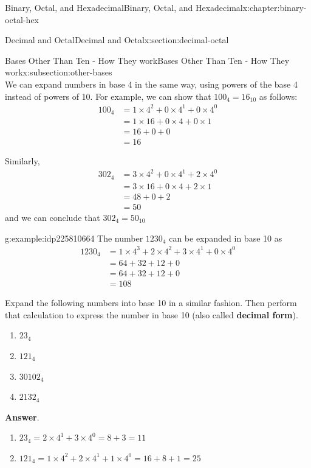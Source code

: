 \documentclass[twoside,10pt,]{book}
\newcommand{\blocktitlefont}{\relax}
\newcommand{\terminology}[1]{\textbf{#1}}
\numberwithin{equation}{section}
\newcommand{\amp}{&}
\begin{document}
\begin{chapterptx}{Binary, Octal, and Hexadecimal}{}{Binary, Octal, and Hexadecimal}{}{}{x:chapter:binary-octal-hex}
\begin{sectionptx}{Decimal and Octal}{}{Decimal and Octal}{}{}{x:section:decimal-octal}
\begin{subsectionptx}{Bases Other Than Ten - How They work}{}{Bases Other Than Ten - How They work}{}{}{x:subsection:other-bases}
\begin{equation*}
\end{equation*}
We can expand numbers in base 4 in the same way, using powers of the base 4 instead of powers of 10.  For example, we can show that \(100_4=16_{10}\) as follows:%
\begin{align*}
100_4 \amp =1\times 4^2+0\times 4^1+0\times 4^0\\
\amp =1\times 16+0\times 4+0\times 1\\
\amp =16+0+0\\
\amp =16
\end{align*}
%
\par
Similarly,%
\begin{align*}
302_4 \amp = 3\times 4^2+0\times 4^1+2\times 4^0\\
\amp = 3\times 16+0\times 4+2\times 1\\
\amp = 48+0+2\\
\amp = 50
\end{align*}
and we can conclude that \(302_4=50_{10}\)%
\begin{example}{}{g:example:idp225810664}%
The number \(1230_4\) can be expanded in base 10 as%
\begin{align*}
1230_4 \amp = 1\times 4^3+2\times 4^2+3\times 4^1+0\times 4^0\\
\amp = 64+32+12+0\\
\amp = 64+32+12+0\\
\amp = 108
\end{align*}
%
\par
Expand the following numbers into base 10 in a similar fashion.  Then perform that calculation to express the number in base 10 (also called \terminology{decimal form}).%
%
\begin{enumerate}
\item{}\(\displaystyle 23_4\)%
\item{}\(\displaystyle 121_4\)%
\item{}\(\displaystyle 30102_4\)%
\item{}\(\displaystyle 2132_4\)%
\end{enumerate}
\par\smallskip%
\noindent\textbf{\blocktitlefont Answer}.\label{g:answer:idp225811432}{}\hypertarget{g:answer:idp225811432}{}\quad{}%
\begin{enumerate}
\item{}\(\displaystyle 23_4=2\times 4^1+3\times 4^0=8+3=11\)%
\item{}\(\displaystyle 121_4=1\times 4^2+2\times 4^1+1\times 4^0=16+8+1=25\)%

\end{enumerate}
\end{example}
\end{subsectionptx}
\end{sectionptx}
\end{chapterptx}
\end{document}
